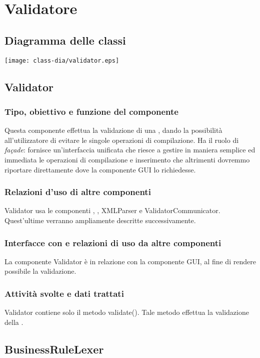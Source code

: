\section{Validatore}
\subsection{Diagramma delle classi}
\begin{center}
\texttt{[image: class-dia/validator.eps]}
\end{center}
\subsection{Validator}%
\subsubsection{Tipo, obiettivo e funzione del componente}
Questa componente effettua la validazione di una \br, dando la possibilit\`a all'utilizzatore di evitare le singole operazioni di compilazione. Ha il ruolo di \textit{fa\c{c}ade}: fornisce un'interfaccia unificata che riesce a gestire in maniera semplice ed immediata le operazioni di compilazione e inserimento che altrimenti dovremmo riportare direttamente dove la componente GUI lo richiedesse.
\subsubsection{Relazioni d'uso di altre componenti}
Validator usa le componenti \brp, \brl, XMLParser e ValidatorCommunicator. Quest'ultime verranno ampliamente descritte successivamente.
\subsubsection{Interfacce con e relazioni di uso da altre componenti}
La componente Validator \`e in relazione con la componente GUI, al fine di rendere possibile la validazione.
\subsubsection{Attivit\`a svolte e dati trattati}
Validator contiene solo il metodo validate(). Tale metodo effettua la validazione della \br.

\subsection{BusinessRuleLexer}
